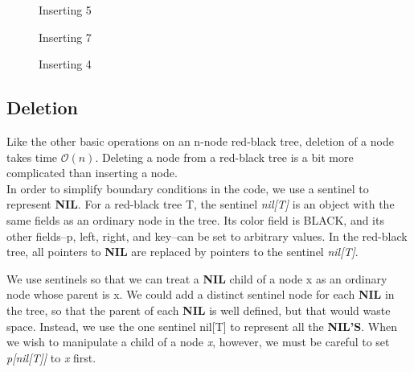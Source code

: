 \documentclass{article}[10pt]
\begin{document}
\begin{figure}
	\centering
	
	\caption{Inserting 5} 
	\label{fig:insert3}
\end{figure}

\begin{figure}
	\centering
	
	\caption{Inserting 7} 
	\label{fig:insert4}
\end{figure}

\begin{figure}
	\centering
	
	\caption{Inserting 4}
	\label{fig:insert5}
\end{figure}








\subsection{Deletion}
Like the other basic operations on an n-node red-black tree, deletion of a node takes
time $\mathcal{O}(n)$. Deleting a node from a red-black tree is a bit more complicated than inserting a node. \\
In order to simplify boundary conditions in the code, we use a sentinel to represent \textbf{NIL}. For a red-black tree T, the sentinel \textit{nil[T]} is an object with the same fields as an ordinary node in the tree. Its color field is BLACK, and its other fields--p, left, right, and key--can be set to arbitrary values. In the red-black tree, all pointers to \textbf{NIL} are replaced by pointers to the sentinel \textit{nil[T]}.

We use sentinels so that we can treat a \textbf{NIL} child of a node x as an ordinary node whose parent is x. We could add a distinct sentinel node for each \textbf{NIL} in the tree, so that the parent of each \textbf{NIL} is well defined, but that would waste space. Instead, we use the one sentinel nil[T] to represent all the \textbf{NIL'S}. When we wish to manipulate a child of a node \textit{x}, however, we must be careful to set \textit{p[nil[T]]} to \textit{x} first.
\end{document}
